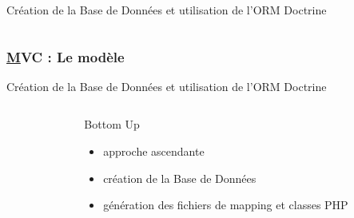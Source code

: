 \begin{frame}
\begin{block}{Création de la Base de Données et utilisation de l'ORM Doctrine}
\begin{columns}
	\end{columns}
	\end{block} 
\end{frame}

\begin{frame}
	\frametitle{\underline{M}VC : Le modèle}
	\begin{block}{Création de la Base de Données et utilisation de l'ORM Doctrine}	
		\begin{columns}
			\begin{column}{0.9cm}
			\end{column}
			\begin{column}{6cm}
				\begin{Large}Bottom Up\end{Large}
				\begin{itemize}
					\item approche ascendante
					\item création de la Base de Données
					\item génération des fichiers de mapping et classes PHP
				\end{itemize}
			\end{column}
			

\end{columns}
\end{block}
\end{frame}
